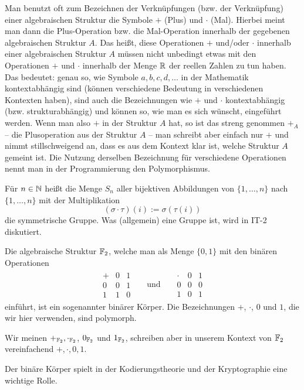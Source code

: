 \begin{bem} 
	Man benutzt oft zum Bezeichnen der Verknüp\-fungen (bzw. der Verknüpfung) einer algebraischen Struktur die Symbole $+$ (Plus) und $\cdot$ (Mal). Hierbei meint man dann die Plus-Operation bzw. die Mal-Operation innerhalb der gegebenen algebraischen Struktur $A$. Das heißt, diese Operationen $+$ und/oder $\cdot$ innerhalb einer algebraischen Struktur $A$ müssen nicht unbedingt etwas mit den Operationen $+$ und $\cdot$ innerhalb der Menge $\mathbb{R}$ der reellen Zahlen zu tun haben. Das bedeutet: genau so, wie Symbole $a,b,c,d,\ldots$ in der Mathematik kontextabhängig sind (können verschiedene Bedeutung in verschiedenen Kontexten haben), sind auch die Bezeichnungen wie $+$ und $\cdot$  kontextabhängig (bzw. strukturabhängig) und können so, wie man es sich wünscht, eingeführt werden. Wenn man also $+$ in der Struktur $A$ hat, so ist das streng genommen $+_A$ -- die Plusoperation aus der Struktur $A$ -- man schreibt aber einfach nur $+$ und nimmt stillschweigend  an, dass es aus dem Kontext klar ist, welche Struktur $A$ gemeint ist. Die Nutzung derselben Bezeichnung für verschiedene Operationen nennt man in der Programmierung den Polymorphismus.
\end{bem} 

\begin{bsp}
	Für $n \in \mathbb{N}$ heißt die Menge $S_n$ aller bijektiven Abbildungen von $\{1,\ldots,n\}$ nach $\{1,\ldots,n\}$ mit der Multiplikation 
	\[(\sigma \cdot \tau )(i) := \sigma(\tau(i))
	\] die symmetrische Gruppe. Was (allgemein) eine Gruppe ist, wird in IT-2 diskutiert. 
\end{bsp} 

\begin{bsp} 
	Die algebraische Struktur $\mathbb{F}_2$, welche man als Menge  $\{0,1\}$ mit den binären Operationen 
\begin{align*}
\begin{array}{c|cc}
	+ & 0 & 1 \\
	\hline 
	0 & 0 & 1 \\
	1 & 1 & 0
\end{array}
& & \text{und} & & 
\begin{array}{c|cc}
\cdot & 0 & 1 \\
\hline 
0 & 0 & 0 \\
1 & 0 & 1
\end{array}
\end{align*} 
einführt, ist ein sogenannter binärer Körper. Die Bezeichnungen $+$, $\cdot$, $0$ und $1$, die wir hier verwenden, sind polymorph. 

Wir meinen $+_{\mathbb{F}_2}, \cdot_{\mathbb{F}_2}$, $0_{\mathbb{F}_2}$ und $1_{\mathbb{F}_2}$, schreiben aber in unserem Kontext von $\mathbb{F}_2$ vereinfachend $+, \cdot, 0, 1$. 

Der binäre Körper spielt in der Kodierungstheorie und der Kryptographie eine wichtige Rolle. 

\end{bsp} 


